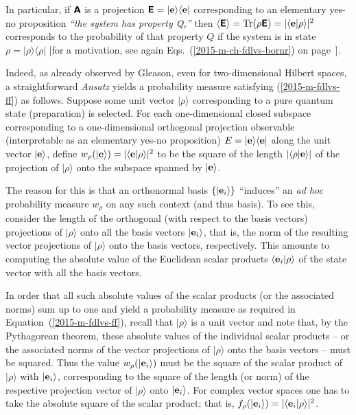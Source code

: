 In particular, if $\textsf{\textbf{A}}$ is a projection $\textsf{\textbf{E}}= \vert {\bf e} \rangle \langle {\bf e} \vert$
corresponding to an elementary yes-no proposition
{\it ``the system has property Q,''} then $\langle \textsf{\textbf{E}}\rangle = \textrm{Tr}({  \rho}  \textsf{\textbf{E}})
=
\vert \langle {\bf e}\vert \rho \rangle \vert^2$ corresponds
to the probability of that property $Q$ if the system is in state $\rho= \vert \rho \rangle \langle \rho \vert$
[for a motivation, see again Eqs.~(\ref{2015-m-ch-fdlvs-bornr}) on page~\pageref{2015-m-ch-fdlvs-bornr}].


Indeed, as already observed by Gleason, even for two-dimensional Hilbert spaces, a straightforward {\it Ansatz}
yields a  probability measure satisfying (\ref{2015-m-fdlvs-ff}) as follows.
Suppose some unit vector $\vert \rho \rangle$ corresponding to a pure quantum state (preparation) is selected.
For each one-dimensional closed subspace corresponding
to a one-dimensional orthogonal projection observable (interpretable as an elementary yes-no proposition)
$E=\vert {\bf e}\rangle \langle {\bf e} \vert$
along the unit vector $\vert {\bf e}\rangle$,
define
$w_\rho(\vert {\bf e}\rangle ) =  \vert \langle {\bf e} \vert  \rho \rangle \vert^2$
to be the  square of the length $\vert \langle \rho \vert {\bf e} \rangle \vert$ of the
projection of $\vert \rho \rangle$ onto the subspace spanned by $\vert {\bf e}\rangle$.



The reason for this is that an orthonormal
basis $\{  \vert  {\bf e}_i \rangle   \}$ ``induces''
an {\it ad hoc}  probability measure $w_\rho $
on any such context (and thus basis).
To see this,
consider the length  of
the orthogonal (with respect to the basis vectors)
projections of $\vert  \rho \rangle$
onto all the basis vectors $\vert  {\bf e}_i \rangle$,
that is, the norm of the resulting vector projections of $\vert \rho \rangle$ onto the basis vectors,
respectively.
This amounts to computing the absolute value of the Euclidean scalar products
$\langle  {\bf e}_i \vert  \rho \rangle$
of the state vector with all the basis vectors.


In order that all such  absolute values of the scalar products (or the associated norms)
sum up to one and yield a probability measure as required in Equation~(\ref{2015-m-fdlvs-ff}),
recall that $\vert  \rho \rangle$ is a unit vector
and note that, by the Pythagorean theorem,
these  absolute values of the individual scalar products
-- or the associated norms of the vector projections of $\vert \rho \rangle$ onto the basis vectors --
must be squared.
Thus the value $w_\rho(\vert {\bf e}_i\rangle )$
must be the square of the scalar product of $\vert  \rho \rangle$
with $\vert  {\bf e}_i \rangle$,
corresponding to the square of the length (or norm) of
the respective projection vector of $\vert  \rho \rangle$ onto  $\vert  {\bf e}_i \rangle$.
For complex vector spaces one has to take the absolute square of the scalar product;
that is, $f_\rho (  \vert  {\bf e}_i \rangle   ) = \vert \langle  {\bf e}_i \vert  \rho \rangle \vert ^2$.

